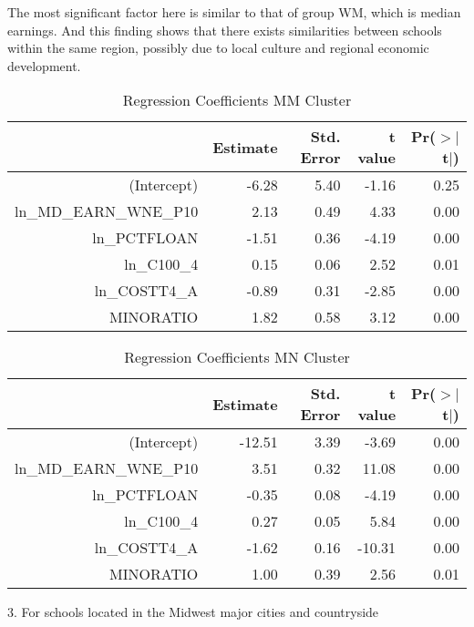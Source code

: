 \documentclass{article}
\begin{document}
The most significant factor here is similar to that of group WM, which is median earnings. And this finding shows that there exists similarities between schools within the same region, possibly due to local culture and regional economic development.

\begin{Schunk}
\begin{Soutput}
\begin{table}[H]
\centering
\begin{tabular}{rrrrr}
  \hline
 & Estimate & Std. Error & t value & Pr($>$$|$t$|$) \\ 
  \hline
(Intercept) & -6.28 & 5.40 & -1.16 & 0.25 \\ 
  ln\_MD\_EARN\_WNE\_P10 & 2.13 & 0.49 & 4.33 & 0.00 \\ 
  ln\_PCTFLOAN & -1.51 & 0.36 & -4.19 & 0.00 \\ 
  ln\_C100\_4 & 0.15 & 0.06 & 2.52 & 0.01 \\ 
  ln\_COSTT4\_A & -0.89 & 0.31 & -2.85 & 0.00 \\ 
  MINORATIO & 1.82 & 0.58 & 3.12 & 0.00 \\ 
   \hline
\end{tabular}
\caption{Regression Coefficients MM Cluster} 
\end{table}
\end{Soutput}
\begin{Soutput}
\begin{table}[H]
\centering
\begin{tabular}{rrrrr}
  \hline
 & Estimate & Std. Error & t value & Pr($>$$|$t$|$) \\ 
  \hline
(Intercept) & -12.51 & 3.39 & -3.69 & 0.00 \\ 
  ln\_MD\_EARN\_WNE\_P10 & 3.51 & 0.32 & 11.08 & 0.00 \\ 
  ln\_PCTFLOAN & -0.35 & 0.08 & -4.19 & 0.00 \\ 
  ln\_C100\_4 & 0.27 & 0.05 & 5.84 & 0.00 \\ 
  ln\_COSTT4\_A & -1.62 & 0.16 & -10.31 & 0.00 \\ 
  MINORATIO & 1.00 & 0.39 & 2.56 & 0.01 \\ 
   \hline
\end{tabular}
\caption{Regression Coefficients MN Cluster} 
\end{table}
\end{Soutput}
\end{Schunk}

3. For schools located in the Midwest major cities and countryside
\end{document}
